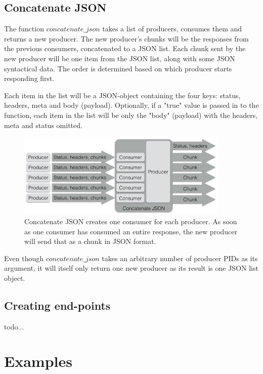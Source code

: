 \documentclass{cslthse-msc}
\begin{document}
\subsection{Concatenate JSON}
The function $concatenate\_json$ takes a list of producers, consumes them and returns a new producer. The new producer's chunks will be the responses from the previous consumers, concatenated to a JSON list. Each chunk sent by the new producer will be one item from the JSON list, along with some JSON syntactical data. The order is determined based on which producer starts responding first.

Each item in the list will be a JSON-object containing the four keys: status, headers, meta and body (payload). Optionally, if a "true" value is passed in to the function, each item in the list will be only the "body" (payload) with the headers, meta and status omitted.


\begin{figure}[H]
  \centering
    \begin{center}
      \includegraphics[width=0.9\textwidth]{images/crocpear_concatenate_json.png}
    \end{center}
  \caption{Concatenate JSON creates one consumer for each producer. As soon as one consumer has consumed an entire response, the new producer will send that as a chunk in JSON format.}
\end{figure}

Even though $concatenate\_json$ takes an arbitrary number of producer PIDs as its argument, it will itself only return one new producer as its result is one JSON list object.

\subsection{Creating end-points}
todo...

\section{Examples}
\end{document}
